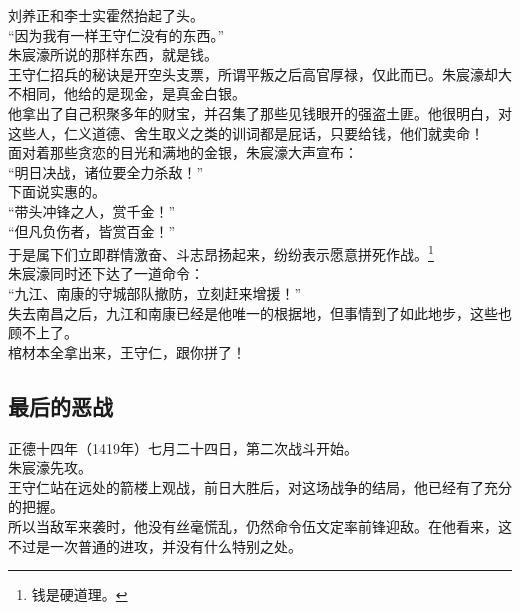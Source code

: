 \begin{multicols}{\theparacolNo}
刘养正和李士实霍然抬起了头。\\

“因为我有一样王守仁没有的东西。”\\

朱宸濠所说的那样东西，就是钱。\\

王守仁招兵的秘诀是开空头支票，所谓平叛之后高官厚禄，仅此而已。朱宸濠却大不相同，他给的是现金，是真金白银。\\

他拿出了自己积聚多年的财宝，并召集了那些见钱眼开的强盗土匪。他很明白，对这些人，仁义道德、舍生取义之类的训词都是屁话，只要给钱，他们就卖命！\\

面对着那些贪恋的目光和满地的金银，朱宸濠大声宣布：\\

“明日决战，诸位要全力杀敌！”\\

下面说实惠的。\\

“带头冲锋之人，赏千金！”\\

“但凡负伤者，皆赏百金！”\\

于是属下们立即群情激奋、斗志昂扬起来，纷纷表示愿意拼死作战。\footnote{钱是硬道理。}\\

朱宸濠同时还下达了一道命令：\\

“九江、南康的守城部队撤防，立刻赶来增援！”\\

失去南昌之后，九江和南康已经是他唯一的根据地，但事情到了如此地步，这些也顾不上了。\\

棺材本全拿出来，王守仁，跟你拼了！\\

\subsection{最后的恶战}
正德十四年（1419年）七月二十四日，第二次战斗开始。\\

朱宸濠先攻。\\

王守仁站在远处的箭楼上观战，前日大胜后，对这场战争的结局，他已经有了充分的把握。\\

所以当敌军来袭时，他没有丝毫慌乱，仍然命令伍文定率前锋迎敌。在他看来，这不过是一次普通的进攻，并没有什么特别之处。\\


\end{multicols}
